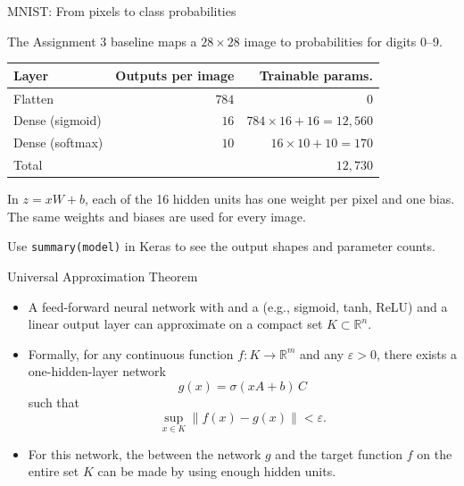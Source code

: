 \documentclass[10pt]{beamer}
\begin{document}
\begin{frame}{MNIST: From pixels to class probabilities}

The Assignment 3 baseline maps a $28\times28$ image to probabilities for digits 0--9.

\begin{center}
\small
\begin{tabular}{@{}lrr@{}}
\hline
Layer & Outputs per image & Trainable params. \\
\hline
Flatten & $784$ & $0$ \\
Dense (sigmoid) & $16$ & $784\times16+16=12{,}560$ \\
Dense (softmax) & $10$ & $16\times10+10=170$ \\
\hline
Total & & $12{,}730$ \\
\hline
\end{tabular}
\end{center}

In $z=xW+b$, each of the 16 hidden units has one weight per pixel and one bias.
The same weights and biases are used for every image.

Use \texttt{summary(model)} in Keras to see the output shapes and parameter counts.

\end{frame}

\begin{frame}{Universal Approximation Theorem}

\begin{itemize}

    \item A feed-forward neural network with  and a
     (e.g., sigmoid, tanh, ReLU)
    and a linear output layer can approximate
     on a compact set $K \subset \mathbb{R}^n$.
    \pause
    \item Formally, for any continuous function $f : K \to \mathbb{R}^m$
    and any $\varepsilon > 0$, there exists a one-hidden-layer network
    \[
        g(x) = \sigma(xA + b)\,C
    \]
    such that
    \[
        \sup_{x \in K} \| f(x) - g(x) \| < \varepsilon.
    \]

    \pause

    \item For this network, the  between the network $g$ and the
    target function $f$ on the entire set $K$ can be made 
    by using enough hidden units.

\end{itemize}

\end{frame}
\end{document}
